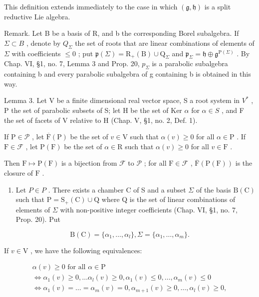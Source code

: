 This definition extends immediately to the case in which \((\mathfrak{g}, \mathfrak{h})\) is a split reductive Lie algebra.

Remark. Let B be a basis of R, and b the corresponding Borel subalgebra. If \(\Sigma \subset B\) , denote by \(Q_{\Sigma}\) the set of roots that are linear combinations of elements of \(\Sigma\) with coefficients \(\leq 0\) ; put \(\mathfrak{p}(\Sigma) = \mathrm{R}_{+}(\mathrm{B}) \cup \mathrm{Q}_{\Sigma}\) and \(\mathfrak{p}_{\Sigma} = \mathfrak{h} \oplus \mathfrak{g}^{\mathrm{P}(\Sigma)}\) . By Chap. VI, §1, no. 7, Lemma 3 and Prop. 20, \(p_{\Sigma}\) is a parabolic subalgebra containing b and every parabolic subalgebra of g containing b is obtained in this way.

Lemma 3. Let V be a finite dimensional real vector space, S a root system in \(V^{*}\) , P the set of parabolic subsets of S; let H be the set of Ker \(\alpha\) for \(\alpha \in S\) , and F the set of facets of V relative to H (Chap. V, §1, no. 2, Def. 1).

If \(\mathrm{P} \in \mathcal{P}\) , let \(\overline{\mathrm{F}}(\mathrm{P})\) be the set of \(v \in \mathrm{V}\) such that \(\alpha(v) \geq 0\) for all \(\alpha \in \mathrm{P}\) . If \(\mathrm{F} \in \mathcal{F}\) , let \(\mathrm{P}(\mathrm{F})\) be the set of \(\alpha \in \mathrm{R}\) such that \(\alpha(v) \geq 0\) for all \(v \in \mathrm{F}\) .

Then \(\mathrm{F} \mapsto \mathrm{P}(\mathrm{F})\) is a bijection from \(\mathcal{F}\) to \(\mathcal{P}\) ; for all \(\mathrm{F} \in \mathcal{F}\) , \(\overline{\mathrm{F}}(\mathrm{P}(\mathrm{F}))\) is the closure of \(\mathrm{F}\) .

\begin{enumerate}
\def\labelenumi{\alph{enumi})}
\tightlist
\item
  Let \(P \in P\) . There exists a chamber C of S and a subset \(\Sigma\) of the basis \(\mathrm{B}(\mathrm{C})\) such that \(\mathrm{P} = \mathrm{S}_{+}(\mathrm{C}) \cup \mathrm{Q}\) where Q is the set of linear combinations of elements of \(\Sigma\) with non-positive integer coefficients (Chap. VI, §1, no. 7, Prop. 20). Put
\end{enumerate}

\[
\mathrm{B} (\mathrm{C}) = \{\alpha_ {1}, \dots , \alpha_ {l} \}, \Sigma = \{\alpha_ {1}, \dots , \alpha_ {m} \}.
\]

If \(v \in \mathrm{V}\) , we have the following equivalences:

\[
\begin{array}{c} \alpha (v) \geq 0 \text {   for   all   } \alpha \in \mathrm{P} \\ \Longleftrightarrow \alpha_ {1} (v) \geq 0, \ldots \alpha_ {l} (v) \geq 0, \alpha_ {1} (v) \leq 0, \ldots , \alpha_ {m} (v) \leq 0 \\ \Longleftrightarrow \alpha_ {1} (v) = \dots = \alpha_ {m} (v) = 0, \alpha_ {m + 1} (v) \geq 0, \ldots , \alpha_ {l} (v) \geq 0, \end{array}
\]

